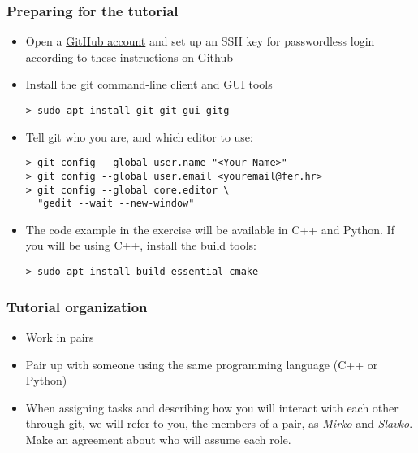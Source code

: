 \begin{frame}[fragile]

\frametitle{Preparing for the tutorial}
	
\begin{itemize}
	\item  Open a \href{https://github.com/join?source=header-home}{GitHub account} and set up an SSH key for passwordless login according to \href{https://help.github.com/articles/adding-a-new-ssh-key-to-your-github-account/}{these instructions on Github}
	\item Install the git command-line client and GUI tools
	\begin{verbatim}
> sudo apt install git git-gui gitg
	\end{verbatim}
	\item Tell git who you are, and which editor to use:
	\begin{verbatim}
> git config --global user.name "<Your Name>"
> git config --global user.email <youremail@fer.hr>
> git config --global core.editor \
  "gedit --wait --new-window"
	\end{verbatim}
	\item The code example in the exercise will be available in C++ and Python. If you will be using C++, install the build tools:
	\begin{verbatim}
> sudo apt install build-essential cmake
	\end{verbatim}
\end{itemize}

\end{frame}


\begin{frame}

\frametitle{Tutorial organization}
	
\begin{itemize}
	\item Work in pairs
	\item Pair up with someone using the same programming language (C++ or Python)
	\item When assigning tasks and describing how you will interact with each other through git, we will refer to you, the members of a pair, as \textit{Mirko} and \textit{Slavko}. Make an agreement about who will assume each role.
\end{itemize}
	
\end{frame}

